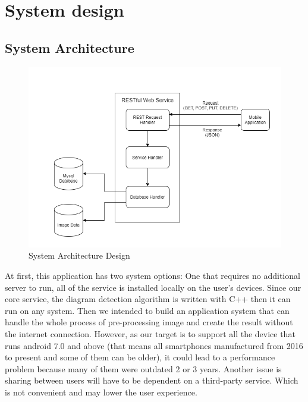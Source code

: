 \chapter{System design} \label{chap:Systemdesign}

\section{System Architecture}
\begin{figure}[!b]
\includegraphics[width=14cm]{Images/App/System_Design.png}
\caption{System Architecture Design}
\end{figure}

At first, this application has two system options: One that requires no additional server to run, all of the service is installed locally on the user's devices. Since our core service, the diagram detection algorithm is written with C++ then it can run on any system. Then we intended to build an application system that can handle the whole process of pre-processing image and create the result without the internet connection. However, as our target is to support all the device that runs android 7.0 and above (that means all smartphones manufactured from 2016 to present and some of them can be older), it could lead to a performance problem because many of them were outdated 2 or 3 years. Another issue is sharing between users will have to be dependent on a third-party service. Which is not convenient and may lower the user experience.

